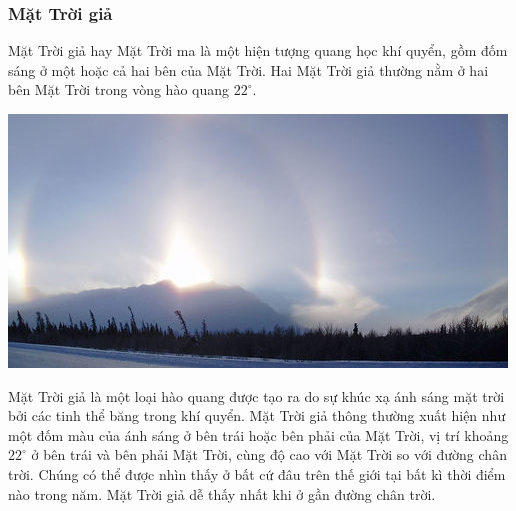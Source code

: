\subsubsection{Mặt Trời giả}
Mặt Trời giả hay Mặt Trời ma là một hiện tượng quang học khí quyển, gồm đốm sáng ở một hoặc cả hai bên của Mặt Trời. Hai Mặt Trời giả thường nằm ở hai bên Mặt Trời trong vòng hào quang $22^\circ$.
\begin{center}
	\includegraphics[width=0.6\linewidth]{../figs/G10-035-6}
\end{center}
Mặt Trời giả là một loại hào quang được tạo ra do sự khúc xạ ánh sáng mặt trời bởi các tinh thể băng trong khí quyển. Mặt Trời giả thông thường xuất hiện như một đốm màu của ánh sáng ở bên trái hoặc bên phải của Mặt Trời, vị trí khoảng $22^\circ$ ở bên trái và bên phải Mặt Trời, cùng độ cao với Mặt Trời so với đường chân trời. Chúng có thể được nhìn thấy ở bất cứ đâu trên thế giới tại bất kì thời điểm nào trong năm. Mặt Trời giả dễ thấy nhất khi ở gần đường chân trời.
